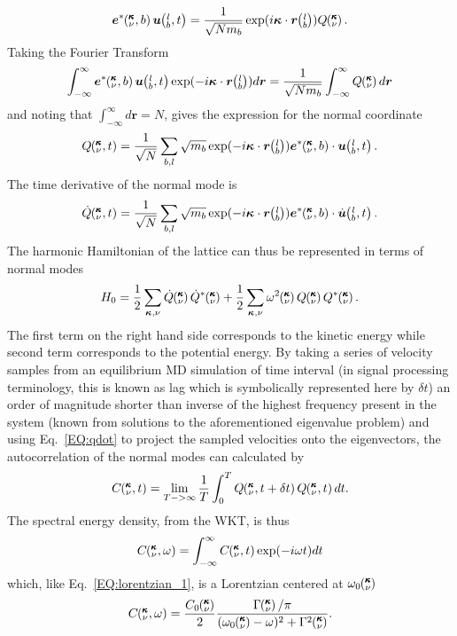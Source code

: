 %
\begin{equation}
\bm{e}^*\kvb\bm{u}\lbt=\frac{1}{\sqrt{Nm_b}}\exp(i\bm{\kappa}\cdot\bm{r}\lb)Q\kv.
\end{equation}
%
Taking the Fourier Transform
%
\begin{equation}
\int_{-\infty}^{\infty}\bm{e}^*\kvb\bm{u}\lbt \exp(-i\bm{\kappa}\cdot\bm{r}\lb)d\bm{r}=\frac{1}{\sqrt{Nm_b}}\int_{-\infty}^{\infty}Q\kv d\bm{r}
\end{equation}
%
and noting that $\int_{-\infty}^{\infty}d\bm{r}=N$, gives the expression for the normal coordinate
%
\begin{equation}
Q\kvt=\frac{1}{\sqrt{N}}\sum_{b,l}\sqrt{m_b}\exp(-i\bm{\kappa}\cdot\bm{r}\lb)\bm{e}^*\kvb\cdot\bm{u}\lbt.
\end{equation}
%
The time derivative of the normal mode is
%
\begin{equation}\label{EQ:qdot}
\dot{Q}\kvt=\frac{1}{\sqrt{N}}\sum_{b,l}\sqrt{m_b}\exp(-i\bm{\kappa}\cdot\bm{r}\lb)\bm{e}^*\kvb\cdot\dot{\bm{u}}\lbt.
\end{equation}
%
The harmonic Hamiltonian of the lattice can thus be represented in terms of normal modes
%
\begin{equation}
H_0=\frac{1}{2}\sum_{\bm{\kappa},\nu}\dot{Q}\kv\dot{Q}^*\kv+\frac{1}{2}\sum_{\bm{\kappa},\nu}\omega^2\kv Q\kv Q^*\kv.
\end{equation}
%
The first term on the right hand side corresponds to the kinetic energy while second term corresponds to the potential energy. By taking a series of velocity samples from an equilibrium MD simulation of time interval (in signal processing terminology, this is known as lag which is symbolically represented here by $\delta t$) an order of magnitude shorter than inverse of the highest frequency present in the system (known from solutions to the aforementioned eigenvalue problem) and using Eq.~\ref{EQ:qdot} to project the sampled velocities onto the eigenvectors, the autocorrelation of the normal modes can calculated by
%
\begin{equation}\label{EQ:corrqdot}
C\kvt=\lim_{T->\infty}\frac{1}{T}\int_{0}^{T}Q\kvtt Q\kvt dt.
\end{equation}
%
The spectral energy density, from the WKT, is thus
%
\begin{equation}\label{EQ:NMD:SED}
C\mspace{-4.0mu}\left(\mspace{-8.0mu} \begin{smallmatrix}&\pmb{\kappa} \\&\nu\end{smallmatrix} \mspace{-2.0mu},\omega\right)=\int_{-\infty}^{\infty}C\mspace{-4.0mu}\left(\mspace{-8.0mu} \begin{smallmatrix}&\pmb{\kappa} \\&\nu\end{smallmatrix} \mspace{-2.0mu},t\right) \exp(-i\omega t)dt
\end{equation}
%
which, like Eq.~\ref{EQ:lorentzian_1}, is a Lorentzian centered at $\omega_0\mspace{-4.0mu}\left(\mspace{-8.0mu} \begin{smallmatrix}&\pmb{\kappa} \\&\nu\end{smallmatrix} \mspace{-3.0mu}\right)$
%
\begin{equation}\label{EQ:NMD:LOR}
C\kvw=\frac{C_0\kv}{2}\frac{\Gamma\kv/\pi}{(\omega_0\kv-\omega)^2+\Gamma^2\kv}.
\end{equation}
